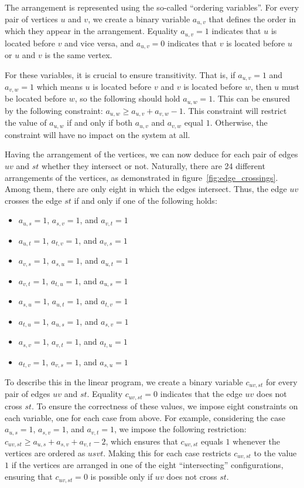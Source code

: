 
The arrangement is represented using the so-called ``ordering variables''.
For every pair of vertices $u$ and $v$, we create a binary variable $a_{u, v}$ that defines the order in which they appear in the arrangement.
Equality $a_{u, v} = 1$ indicates that $u$ is located before $v$ and vice versa, and $a_{u, v} = 0$ indicates that $v$ is located before $u$ or $u$ and $v$ is the same vertex.

For these variables, it is crucial to ensure transitivity.
That is, if $a_{u, v} = 1$ and $a_{v, w} = 1$ which means $u$ is located before $v$ and $v$ is located before $w$, then $u$ must be located before $w$, so the following should hold $a_{u, w} = 1$.
This can be ensured by the following constraint: $a_{u, w} \geqslant a_{u, v} + a_{v, w} - 1$.
This constraint will restrict the value of $a_{u, w}$ if and only if both $a_{u, v}$ and $a_{v, w}$ equal $1$.
Otherwise, the constraint will have no impact on the system at all.

Having the arrangement of the vertices, we can now deduce for each pair of edges $uv$ and $st$ whether they intersect or not.
Naturally, there are 24 different arrangements of the vertices, as demonstrated in figure~\ref{fig:edge_crossings}.
Among them, there are only eight in which the edges intersect.
Thus, the edge $uv$ crosses the edge $st$ if and only if one of the following holds:
\begin{itemize}[noitemsep]
    \item $a_{u,s} = 1$, $a_{s,v} = 1$, and $a_{v,t} = 1$
    \item $a_{u,t} = 1$, $a_{t,v} = 1$, and $a_{v,s} = 1$
    \item $a_{v,s} = 1$, $a_{s,u} = 1$, and $a_{u,t} = 1$
    \item $a_{v,t} = 1$, $a_{t,u} = 1$, and $a_{u,s} = 1$
    \item $a_{s,u} = 1$, $a_{u,t} = 1$, and $a_{t,v} = 1$
    \item $a_{t,u} = 1$, $a_{u,s} = 1$, and $a_{s,v} = 1$
    \item $a_{s,v} = 1$, $a_{v,t} = 1$, and $a_{t,u} = 1$
    \item $a_{t,v} = 1$, $a_{v,s} = 1$, and $a_{s,u} = 1$
\end{itemize}

To describe this in the linear program, we create a binary variable $c_{uv, st}$ for every pair of edges $uv$ and $st$.
Equality $c_{uv, st} = 0$ indicates that the edge $uv$ does not cross $st$.
To ensure the correctness of these values, we impose eight constraints on each variable, one for each case from above.
For example, considering the case $a_{u,s} = 1$, $a_{s,v} = 1$, and $a_{v,t} = 1$, we impose the following restriction: $c_{uv, st} \geqslant a_{u,s} + a_{s,v} + a_{v,t} - 2$, which ensures that $c_{uv, st}$ equals $1$ whenever the vertices are ordered as $usvt$.
Making this for each case restricts $c_{uv, st}$ to the value $1$ if the vertices are arranged in one of the eight ``intersecting'' configurations, ensuring that $c_{uv, st} = 0$ is possible only if $uv$ does not cross $st$.

